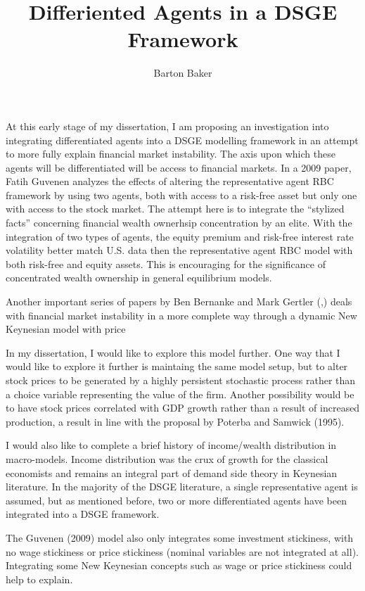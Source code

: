 \documentclass{article}
\numberwithin{equation}{section}
\begin{document}
\title{Differiented Agents in a DSGE Framework}
\author{Barton Baker}
\maketitle
\onehalfspacing

At this early stage of my dissertation, I am proposing an investigation into integrating differentiated agents into a DSGE modelling framework in an attempt to more fully explain financial market instability. The axis upon which these agents will be differentiated will be access to financial markets. In a 2009 paper, Fatih Guvenen analyzes the effects of altering the representative agent RBC framework by using two agents, both with access to a risk-free asset but only one with access to the stock market. The attempt here is to integrate the ``stylized facts'' concerning financial wealth ownerhsip concentration by an elite. With the integration of two types of agents, the equity premium and risk-free interest rate volatility better match U.S. data then the representative agent RBC model with both risk-free and equity assets. This is encouraging for the significance of concentrated wealth ownership in general equilibrium models.

Another important series of papers by Ben Bernanke and Mark Gertler (\citet{bernanke1999financial},\citet{bernanke2000monetary}) deals with financial market instability in a more complete way through a dynamic New Keynesian model with price

In my dissertation, I would like to explore this model further. One way that I would like to explore it further is maintaing the same model setup, but to alter stock prices to be generated by a highly persistent stochastic process rather than a choice variable representing the value of the firm. Another possibility would be to have stock prices correlated with GDP growth rather than a result of increased production, a result in line with the proposal by Poterba and Samwick (1995).

I would also like to complete a brief history of income/wealth distribution in macro-models. Income distribution was the crux of growth for the classical economists and remains an integral part of demand side theory in Keynesian literature. In the majority of the DSGE literature, a single representative agent is assumed, but as mentioned before, two or more differentiated agents have been integrated into a DSGE framework.

The Guvenen (2009) model also only integrates some investment stickiness, with no wage stickiness or price stickiness (nominal variables are not integrated at all). Integrating some New Keynesian concepts such as wage or price stickiness could help to explain.


\nocite{guvenen2009parsimonious, poterba1995stock}


%
%
\end{document}
